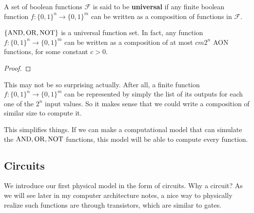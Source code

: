   \begin{definition}
    \label{def:universal-operation-set}
    A set of boolean functions $\mathcal{F}$ is said to be \textbf{universal} if any finite boolean function $f: \{0, 1\}^n \to \{0, 1\}^m$ can be written as a composition of functions in $\mathcal{F}$.
  \end{definition}

  \begin{theorem}
    \label{thm:aon_univ}
    $\{\operatorname{AND}, \operatorname{OR}, \operatorname{NOT}\}$ is a universal function set. In fact, any function $f: \{0,1\}^n \to \{0,1\}^m$ can be written as a composition of at most $c m 2^n$ AON functions, for some constant $c > 0$. 
  \end{theorem}
  \begin{proof}
    
  \end{proof}

  This may not be so surprising actually. After all, a finite function $f: \{0,1\}^n \to \{0,1\}^m$ can be represented by simply the list of its outputs for each one of the $2^n$ input values. So it makes sense that we could write a composition of similar size to compute it. 

  This simplifies things. If we can make a computational model that can simulate the $\operatorname{AND}, \operatorname{OR}, \operatorname{NOT}$ functions, this model will be able to compute every function. 

\subsection{Circuits}

  We introduce our first physical model in the form of circuits. Why a circuit? As we will see later in my computer architecture notes, a nice way to physically realize such functions are through transistors, which are similar to gates. 

